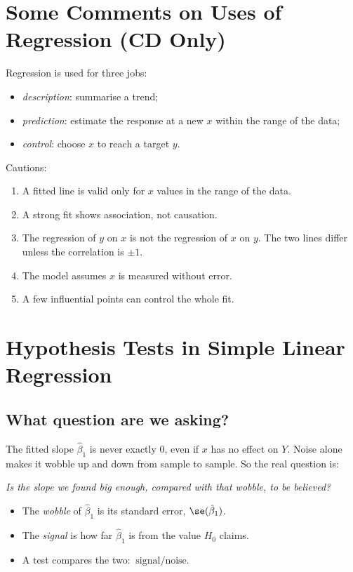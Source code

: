 \section{Some Comments on Uses of Regression (CD Only)}

Regression is used for three jobs:
\begin{itemize}
  \item \emph{description}: summarise a trend;
  \item \emph{prediction}: estimate the response at a new $x$ within the range of the data;
  \item \emph{control}: choose $x$ to reach a target $y$.
\end{itemize}
Cautions:
\begin{enumerate}
  \item A fitted line is valid only for $x$ values in the range of the data.
  \item A strong fit shows association, not causation.
  \item The regression of $y$ on $x$ is not the regression of $x$ on $y$. The two lines differ unless the correlation is $\pm1$.
  \item The model assumes $x$ is measured without error.
  \item A few influential points can control the whole fit.
\end{enumerate}

\section{Hypothesis Tests in Simple Linear Regression}

\subsection{What question are we asking?}

The fitted slope $\hat\beta_1$ is never exactly $0$, even if $x$ has no effect on $Y$. Noise alone makes it wobble up and down from sample to sample. So the real question is:

\begin{center}
\emph{Is the slope we found big enough, compared with that wobble, to be believed?}
\end{center}

\begin{itemize}
  \item The \emph{wobble} of $\hat\beta_1$ is its standard error, $\se(\hat\beta_1)$.
  \item The \emph{signal} is how far $\hat\beta_1$ is from the value $H_0$ claims.
  \item A test compares the two: $\ \text{signal}/\text{noise}$.
\end{itemize}

